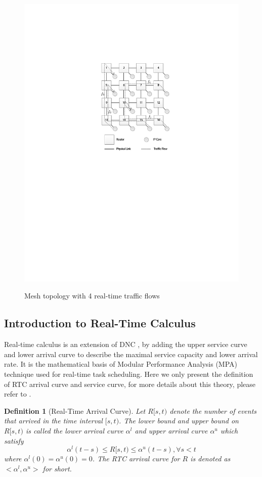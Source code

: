 \documentclass[10pt,journal]{IEEEtran}
\newtheorem{definition}{Definition}
\begin{document}
\begin{figure}
  \centering
  \includegraphics[scale=0.9]{figures/mesh.pdf}\\
  \caption{Mesh topology with 4 real-time traffic flows}\label{topology}
\end{figure}

\subsection{Introduction to Real-Time Calculus}
Real-time calculus is an extension of DNC \cite{ThCN00}\cite{1253607}, by adding the upper service curve and lower arrival curve to describe the maximal service capacity and lower arrival rate. It is the mathematical basis of Modular Performance Analysis (MPA) \cite{Wandeler2006System} technique used for real-time task scheduling. Here we only present the definition of RTC arrival curve and service curve, for more details about this theory, please refer to \cite{ThCN00}\cite{1253607}.
\begin{definition}[Real-Time Arrival Curve]
Let $R[s,t)$ denote the number of events that arrived in the time interval $[s,t)$. The lower bound and upper bound on $R[s,t)$ is called the lower arrival curve $\alpha^l$ and upper arrival curve $\alpha^u$ which satisfy
$$\alpha^l(t-s)\leq R[s,t)\leq \alpha^u(t-s),\forall s<t$$
where $\alpha^l(0)=\alpha^u(0)=0$. The RTC arrival curve for $R$ is denoted as $<\alpha^l,\alpha^u>$ for short.
\end{definition}
\end{document}
